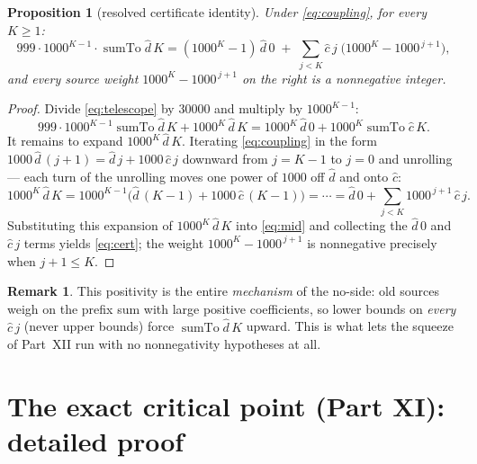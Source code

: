 \documentclass[11pt]{article}
\newcommand{\dhat}{\widehat{d}}
\newcommand{\chat}{\widehat{c}}
\newcommand{\sumto}{\operatorname{sumTo}}
\theoremstyle{plain}
\newtheorem{proposition}[lemma]{Proposition}
\theoremstyle{definition}
\newtheorem{remark}[lemma]{Remark}
\begin{document}
\begin{proposition}[resolved certificate identity]\label{prop:cert}
Under \eqref{eq:coupling}, for every $K\ge 1$:
\begin{equation}\label{eq:cert}
999\cdot 1000^{K-1}\cdot\sumto\dhat\,K
=(1000^{K}-1)\,\dhat\,0\;+\;\sum_{j<K}\chat\,j\;\bigl(1000^{K}-1000^{\,j+1}\bigr),
\end{equation}
and every source weight $1000^{K}-1000^{\,j+1}$ on the right is a \emph{nonnegative} integer.
\end{proposition}
\begin{proof}
Divide \eqref{eq:telescope} by $30000$ and multiply by $1000^{K-1}$:
\begin{equation}\label{eq:mid}
999\cdot 1000^{K-1}\sumto\dhat\,K+1000^{K}\,\dhat\,K
=1000^{K}\,\dhat\,0+1000^{K}\sumto\chat\,K .
\end{equation}
It remains to expand $1000^{K}\,\dhat\,K$. Iterating \eqref{eq:coupling} in the form
$1000\,\dhat\,(j+1)=\dhat\,j+1000\,\chat\,j$ downward from $j=K-1$ to $j=0$ and
unrolling --- each turn of the unrolling moves one power of $1000$ off $\dhat$ and onto
$\chat$:
\[
1000^{K}\,\dhat\,K=1000^{K-1}\bigl(\dhat\,(K-1)+1000\,\chat\,(K-1)\bigr)
=\cdots=\dhat\,0+\sum_{j<K}1000^{\,j+1}\,\chat\,j .
\] Substituting this expansion of $1000^{K}\,\dhat\,K$ into \eqref{eq:mid} and
collecting the $\dhat\,0$ and $\chat\,j$ terms yields \eqref{eq:cert}; the weight
$1000^{K}-1000^{\,j+1}$ is nonnegative precisely when $j+1\le K$.
\end{proof}

\begin{remark}
This positivity is the entire \emph{mechanism} of the no-side: old sources weigh on the
prefix sum with large positive coefficients, so lower bounds on \emph{every}
$\chat\,j$ (never upper bounds) force $\sumto\dhat\,K$ upward. This is what lets the
squeeze of Part~XII run with no nonnegativity hypotheses at all.
\end{remark}

\section{The exact critical point (Part XI): detailed proof}\label{sec:critical}
\end{document}
